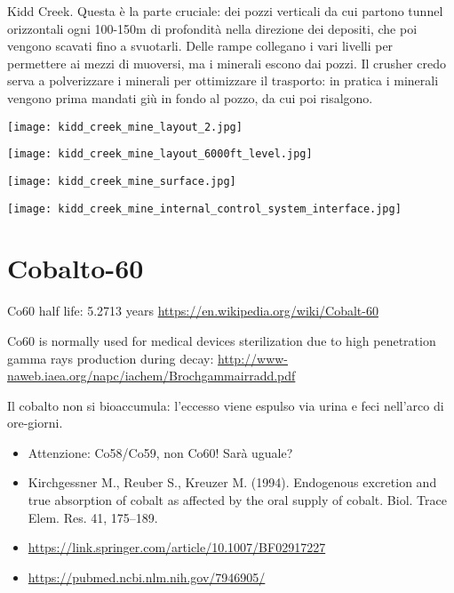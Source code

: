 \documentclass[a4paper,10pt,openany,oneside]{memoir}
\begin{document}
Kidd Creek. Questa è la parte cruciale: dei pozzi verticali da cui partono tunnel orizzontali ogni 100-150m di profondità nella direzione dei depositi, che poi vengono scavati fino a svuotarli. Delle rampe collegano i vari livelli per permettere ai mezzi di muoversi, ma i minerali escono dai pozzi. Il crusher credo serva a polverizzare i minerali per ottimizzare il trasporto: in pratica i minerali vengono prima mandati giù in fondo al pozzo, da cui poi risalgono.

\texttt{[image: kidd\_creek\_mine\_layout\_2.jpg]}

\texttt{[image: kidd\_creek\_mine\_layout\_6000ft\_level.jpg]}

\texttt{[image: kidd\_creek\_mine\_surface.jpg]}

\texttt{[image: kidd\_creek\_mine\_internal\_control\_system\_interface.jpg]}



\section{Cobalto-60}
Co60 half life: 5.2713 years \url{https://en.wikipedia.org/wiki/Cobalt-60}

Co60 is normally used for medical devices sterilization due to high penetration gamma rays production during decay: \url{http://www-naweb.iaea.org/napc/iachem/Brochgammairradd.pdf}

Il cobalto non si bioaccumula: l'eccesso viene espulso via urina e feci nell'arco di ore-giorni. 
\begin{itemize}
  \item Attenzione: Co58/Co59, non Co60! Sarà uguale?
  \item Kirchgessner M., Reuber S., Kreuzer M. (1994). Endogenous excretion and true absorption of cobalt as affected by the oral supply of cobalt. Biol. Trace Elem. Res. 41, 175–189.
  \item \url{https://link.springer.com/article/10.1007/BF02917227}
  \item \url{https://pubmed.ncbi.nlm.nih.gov/7946905/}
\end{itemize}


\end{document}
